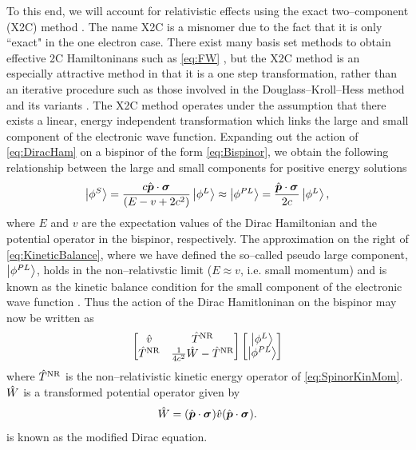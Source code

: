 To this end, we will account for relativistic effects using the exact two--component (X2C) method .
The name X2C is a misnomer due to the fact that it is only ``exact" in the one electron case. There
exist many basis set methods to obtain effective 2C Hamiltoninans such as \cref{eq:FW} ,
but the X2C method is an especially attractive method in that it is a one step transformation, rather than
an iterative procedure such as those involved in the Douglass--Kroll--Hess method and its variants .
The X2C method operates under the assumption that there exists a linear, energy independent transformation which
links the large and small component of the electronic wave function. Expanding out the action of \cref{eq:DiracHam}
on a bispinor of the form \cref{eq:Bispinor}, we obtain the following relationship between the large and small components for positive energy 
solutions
\begin{equation}
  \label{eq:KineticBalance}
  \left\vert \phi^S \right\rangle = \frac{c \hat{\boldsymbol{p}} \cdot \boldsymbol{\sigma}_{}}{(E - v + 2c^2)} \left\vert \phi^L  \right\rangle \approx 
    \left\vert \phi^{PL}  \right\rangle = \frac{\hat{\boldsymbol{p}} \cdot \boldsymbol{\sigma}_{}}{2c} \left\vert \phi^L  \right\rangle,
\end{equation}
where $E$ and $v$ are the expectation values of the Dirac Hamiltonian and the potential operator in the bispinor, respectively.
The approximation on the right of \cref{eq:KineticBalance}, where we have defined the so--called pseudo large component, $\left\vert \phi^{PL} \right\rangle$,
holds in the non--relativstic limit ($E \approx v$, i.e. small momentum)
and is known as the kinetic balance condition for the small component of the electronic wave function . 
Thus the action of the Dirac Hamitloninan on the bispinor may now be written as
\begin{equation}
\label{eq:ModDirac}
\begin{bmatrix}
\hat{v} & \hat{T}^{\mathrm{NR}} \\ \hat{T}^{\mathrm{NR}} & \frac{1}{4c^2} \hat{W} - \hat{T}^{\mathrm{NR}}
\end{bmatrix}
\begin{bmatrix}
\left\vert \phi^L \right\rangle \\ \left\vert \phi^{PL} \right\rangle
\end{bmatrix}
\end{equation}
where $\hat{T}^{\mathrm{NR}}$ is the non--relativistic kinetic energy operator of \cref{eq:SpinorKinMom}. $\hat{W}$ is a transformed
potential operator given by
\begin{equation}
\hat{W} = (\hat{\boldsymbol{p}} \cdot \boldsymbol{\sigma}_{}) \hat{v} (\hat{\boldsymbol{p}} \cdot \boldsymbol{\sigma}_{}).
\end{equation}
 is known as the modified Dirac equation.

